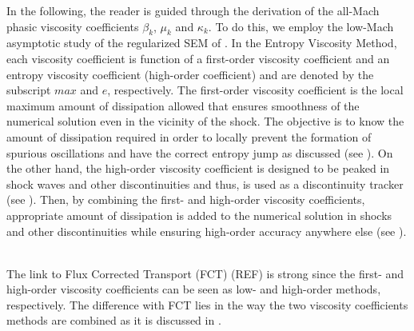 \documentclass[preprint,10pt]{elsarticle}
\begin{document}
In the following, the reader is guided through the derivation of the all-Mach phasic viscosity coefficients $\beta_k$, $\mu_k$ and $\kappa_k$. To do this, we employ 
the low-Mach asymptotic study of the regularized SEM of \cite{Marco_paper_sem}. 
In the Entropy Viscosity Method, each viscosity coefficient is function of a first-order 
viscosity coefficient and an entropy viscosity coefficient (high-order coefficient) 
and are denoted by the subscript $max$ and $e$, respectively. The first-order viscosity coefficient is the local maximum amount of dissipation allowed that ensures smoothness of the numerical solution even in the vicinity of the shock. The objective is to know the amount of dissipation required in order to locally prevent the formation of spurious oscillations and have the correct entropy jump as discussed (see ). On the other hand, the high-order viscosity coefficient is designed to be peaked in shock waves and other discontinuities and thus, is used as a discontinuity tracker (see ). Then, by combining the first- and high-order viscosity coefficients, appropriate amount of dissipation is added to the numerical solution in shocks and other discontinuities while ensuring high-order accuracy anywhere else (see ).
\\  
\\
\begin{remark}
The link to Flux Corrected Transport (FCT) (REF) is strong since the first- and high-order viscosity coefficients can be seen as low- and high-order methods, respectively. The difference with FCT lies in the way the two viscosity coefficients methods are combined as it is discussed in .
\end{remark}
%
\end{document}
